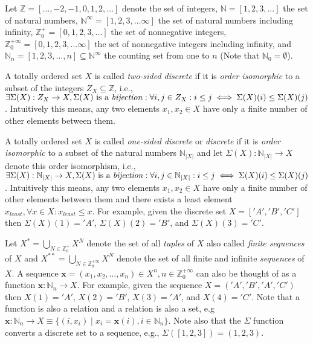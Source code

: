 Let $\mathbb{Z} = [\ldots,-2,-1,0,1,2,\ldots]$ denote the set of integers,
$\mathbb{N} = [1,2,3,\ldots]$ the set of natural numbers,
$\mathbb{N}^\infty = [1,2,3,\ldots\infty]$ the set of natural numbers including infinity,
$\mathbb{Z}^+_0 = [0,1,2,3,\ldots]$ the set of nonnegative integers,
$\mathbb{Z}^{+\infty}_0 = [0,1,2,3,\ldots\infty]$ the set of nonnegative integers including infinity,
and $\mathbb{N}_n = [1,2,3,\ldots,n] \subseteq \mathbb{N}^\infty$ the counting set from one to $n$
(Note that $\mathbb{N}_0 = \emptyset$).

A totally ordered set $X$ is called \emph{two-sided discrete}
if it is \emph{order isomorphic} to a subset of the integers $Z_X \subseteq \mathbb{Z}$,
i.e., $\exists{\Sigma(X): Z_X \to X, \Sigma(X)\textrm{ is a \emph{bijection}}}:
 \forall{i,j \in Z_X}: i \le j \iff \Sigma(X)(i) \le \Sigma(X)(j)$.
Intuitively this means, any two elements
$x_1, x_2 \in X$ have only a finite number of other elements between them.

A totally ordered set $X$ is called \emph{one-sided discrete} or \emph{discrete}
if it is \emph{order isomorphic} to a subset of the natural numbers $\mathbb{N}_{|X|}$
and let $\Sigma(X): \mathbb{N}_{|X|} \to X$ denote this order isomorphism,
i.e., $\exists{\Sigma(X): \mathbb{N}_{|X|} \to X, \Sigma(X)\textrm{ is a \emph{bijection}}}:
 \forall{i,j \in \mathbb{N}_{|X|}}: i \le j \iff \Sigma(X)(i) \le \Sigma(X)(j)$.
Intuitively this means,
any two elements $x_1, x_2 \in X$ have only a finite number of other elements
between them and there exists a least element $x_{least}, \forall{x \in X}: x_{least} \le x$.
For example, given the discrete set $X = ['A', 'B', 'C']$ then
$\Sigma(X)(1) = 'A'$,  $\Sigma(X)(2) = 'B'$, and $\Sigma(X)(3) = 'C'$.

Let $X^* = \bigcup_{N \in \mathbb{Z}^+_0} X^N$ denote the set of all
\emph{tuples} of $X$ also called \emph{finite sequences} of $X$ and
$X^{**} = \bigcup_{N \in \mathbb{Z}^{+\infty}_0} X^N$ denote the set of all
finite and infinite \emph{sequences} of $X$. A sequence
$\mathbf{x} = (x_1,x_2,\ldots,x_n) \in X^n, n \in \mathbb{Z}^{+\infty}_0$
can also be thought of as a function $\mathbf{x} : \mathbb{N}_n \to X$.
For example, given the sequence $X = ('A', 'B', 'A', 'C')$ then
$X(1) = 'A'$,  $X(2) = 'B'$, $X(3) = 'A'$, and $X(4) = 'C'$.
Note that a function is also a relation and a relation is also a set, e.g
$\mathbf{x} : \mathbb{N}_n \to X \equiv \{ (i,x_i) \mid x_i = \mathbf{x}(i), i \in \mathbb{N}_n \}$.
Note also that the $\Sigma$ function converts a discrete set to a sequence,
e.g., $\Sigma([1,2,3]) = (1,2,3)$.

